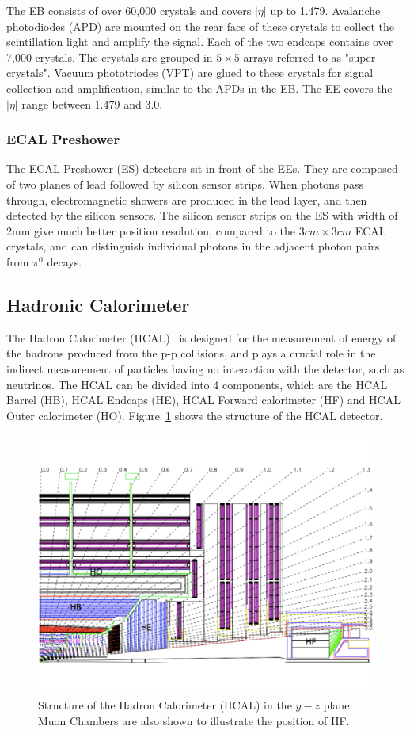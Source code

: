 \vspace{0.3cm}
The EB consists of over 60,000 crystals and covers $|\eta|$ up to 1.479. Avalanche photodiodes (APD) are mounted on the rear face of these crystals to collect the scintillation light and amplify the signal. Each of the two endcaps contains over 7,000 crystals. The crystals are grouped in $5\times 5$ arrays referred to as "super crystals". Vacuum phototriodes (VPT) are glued to these crystals for signal collection and amplification, similar to the APDs in the EB. The EE covers the $|\eta|$ range between 1.479 and 3.0. 

\subsubsection{ECAL Preshower}
The ECAL Preshower (ES) detectors sit in front of the EEs. They are composed of two planes of lead followed by silicon sensor strips. When photons pass through, electromagnetic showers are produced in the lead layer, and then detected by the silicon sensors. The silicon sensor strips on the ES with width of 2mm give much better position resolution, compared to the $3cm\times 3cm$ ECAL crystals, and can distinguish individual photons in the adjacent photon pairs from $\pi^{0}$ decays.

\subsection{Hadronic Calorimeter} 
The Hadron Calorimeter (HCAL)~\cite{lhc_hcaldesign} is designed for the measurement of energy of the hadrons produced from the p-p collisions, and plays a crucial role in the indirect measurement of particles having no interaction with the detector, such as neutrinos. The HCAL can be divided into 4 components, which are the HCAL Barrel (HB), HCAL Endcaps (HE), HCAL Forward calorimeter (HF) and HCAL Outer calorimeter (HO). Figure~\ref{fig:lhc_hcaldesign} shows the structure of the HCAL detector.
\begin{figure}[htbp]
\begin{center}
\includegraphics[width=0.7\linewidth]{figures/lhc_hcaldesign.pdf}
\caption{Structure of the Hadron Calorimeter (HCAL) in the $y-z$ plane. Muon Chambers are also shown to illustrate the position of HF.}
\label{fig:lhc_hcaldesign}
\end{center}
\end{figure}

